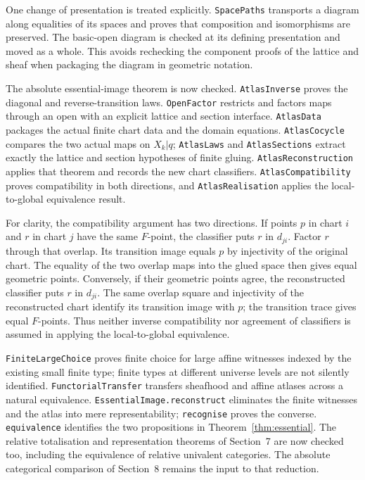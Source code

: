 \documentclass[11pt]{amsart}
\theoremstyle{definition}\newtheorem{definition}[theorem]{Definition}
\theoremstyle{remark}\newtheorem{remark}[theorem]{Remark}
\begin{document}
One change of presentation is treated explicitly. \texttt{SpacePaths}
transports a diagram along equalities of its spaces and proves that
composition and isomorphisms are preserved. The basic-open diagram is
checked at its defining presentation and moved as a whole. This avoids
rechecking the component proofs of the lattice and sheaf when packaging
the diagram in geometric notation.

The absolute essential-image theorem is now checked.
\texttt{AtlasInverse} proves the diagonal and reverse-transition laws.
\texttt{OpenFactor} restricts and factors maps through an open with an
explicit lattice and section interface. \texttt{AtlasData} packages the
actual finite chart data and the domain equations.
\texttt{AtlasCocycle} compares the two actual maps on $X_k|q$;
\texttt{AtlasLaws} and \texttt{AtlasSections} extract exactly the lattice
and section hypotheses of finite gluing. \texttt{AtlasReconstruction}
applies that theorem and records the new chart classifiers.
\texttt{AtlasCompatibility} proves compatibility in both directions,
and \texttt{AtlasRealisation} applies the local-to-global equivalence
result.

For clarity, the compatibility argument has two directions. If points
$p$ in chart $i$ and $r$ in chart $j$ have the same $F$-point, the
classifier puts $r$ in $d_{ji}$. Factor $r$ through that overlap. Its
transition image equals $p$ by injectivity of the original chart.
The equality of the two overlap maps into the glued space then gives
equal geometric points. Conversely, if their geometric points agree,
the reconstructed classifier puts $r$ in $d_{ji}$. The same overlap
square and injectivity of the reconstructed chart identify its
transition image with $p$; the transition trace gives equal $F$-points.
Thus neither inverse compatibility nor agreement of classifiers is
assumed in applying the local-to-global equivalence.

\texttt{FiniteLargeChoice} proves finite choice for large affine witnesses
indexed by the existing small finite type; finite types at different
universe levels are not silently identified. \texttt{FunctorialTransfer}
transfers sheafhood and affine atlases across a natural equivalence.
\texttt{EssentialImage.reconstruct} eliminates the finite witnesses and
the atlas into mere representability; \texttt{recognise} proves the
converse. \texttt{equivalence} identifies the two propositions in
Theorem~\ref{thm:essential}. The relative totalisation and representation theorems of Section~7 are
now checked too, including the equivalence of relative univalent categories.
The absolute categorical comparison of Section~8 remains the input to
that reduction.
\end{document}
